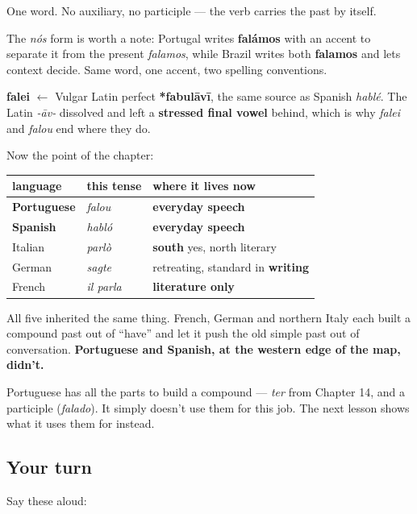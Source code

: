 One word. No auxiliary, no participle — the verb carries the past by itself.

The \emph{nós} form is worth a note: Portugal writes \textbf{falámos} with an accent to separate it from the present \emph{falamos}, while Brazil writes both \textbf{falamos} and lets context decide. Same word, one accent, two spelling conventions.

\textbf{falei} $\leftarrow$ Vulgar Latin perfect \textbf{*fabulāvī}, the same source as Spanish \emph{hablé}. The Latin \emph{-āv-} dissolved and left a \textbf{stressed final vowel} behind, which is why \emph{falei} and \emph{falou} end where they do.

\begin{culture}
Now the point of the chapter:

\noindent
\begin{tabularx}{\linewidth}{@{}>{\raggedright\arraybackslash}X>{\raggedright\arraybackslash}X>{\raggedright\arraybackslash}X@{}}
\toprule
\textbf{language} & \textbf{this tense} & \textbf{where it lives now} \\
\midrule
\textbf{Portuguese} & \emph{falou} & \textbf{everyday speech} \\
\textbf{Spanish} & \emph{habló} & \textbf{everyday speech} \\
Italian & \emph{parlò} & \textbf{south} yes, north literary \\
German & \emph{sagte} & retreating, standard in \textbf{writing} \\
French & \emph{il parla} & \textbf{literature only} \\
\bottomrule
\end{tabularx}

All five inherited the same thing. French, German and northern Italy each built a compound past out of \textquotedblleft{}have\textquotedblright{} and let it push the old simple past out of conversation. \textbf{Portuguese and Spanish, at the western edge of the map, didn't.}

Portuguese has all the parts to build a compound — \emph{ter} from Chapter 14, and a participle (\emph{falado}). It simply doesn't use them for this job. The next lesson shows what it uses them for instead.
\end{culture}

\subsection*{Your turn}
Say these aloud:

